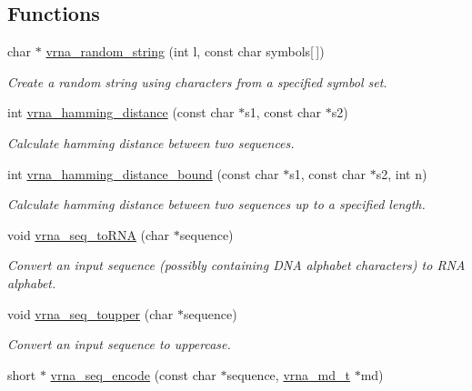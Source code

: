 \subsection*{Functions}
\begin{DoxyCompactItemize}
\item 
char $\ast$ \hyperlink{group__string__utils_ga4eeb3750dcf860b9f3158249f95dbd7f}{vrna\-\_\-random\-\_\-string} (int l, const char symbols\mbox{[}$\,$\mbox{]})
\begin{DoxyCompactList}\small\item\em Create a random string using characters from a specified symbol set. \end{DoxyCompactList}\item 
int \hyperlink{group__string__utils_ga301798b43b6f66687985c725efd14f32}{vrna\-\_\-hamming\-\_\-distance} (const char $\ast$s1, const char $\ast$s2)
\begin{DoxyCompactList}\small\item\em Calculate hamming distance between two sequences. \end{DoxyCompactList}\item 
int \hyperlink{group__string__utils_ga5d1c2271e79d9bcb52d4e68360763fb9}{vrna\-\_\-hamming\-\_\-distance\-\_\-bound} (const char $\ast$s1, const char $\ast$s2, int n)
\begin{DoxyCompactList}\small\item\em Calculate hamming distance between two sequences up to a specified length. \end{DoxyCompactList}\item 
void \hyperlink{group__string__utils_gacfed92cba77064f6c743f9118d079bfc}{vrna\-\_\-seq\-\_\-to\-R\-N\-A} (char $\ast$sequence)
\begin{DoxyCompactList}\small\item\em Convert an input sequence (possibly containing D\-N\-A alphabet characters) to R\-N\-A alphabet. \end{DoxyCompactList}\item 
void \hyperlink{group__string__utils_ga4f44dca03c9d708d68e64c0610bb9091}{vrna\-\_\-seq\-\_\-toupper} (char $\ast$sequence)
\begin{DoxyCompactList}\small\item\em Convert an input sequence to uppercase. \end{DoxyCompactList}\item 
\hypertarget{group__string__utils_ga636e7d6f888fd639587296a5eddea660}{short $\ast$ \hyperlink{group__string__utils_ga636e7d6f888fd639587296a5eddea660}{vrna\-\_\-seq\-\_\-encode} (const char $\ast$sequence, \hyperlink{group__model__details_ga1f8a10e12a0a1915f2a4eff0b28ea17c}{vrna\-\_\-md\-\_\-t} $\ast$md)}\label{group__string__utils_ga636e7d6f888fd639587296a5eddea660}


\end{DoxyCompactItemize}
